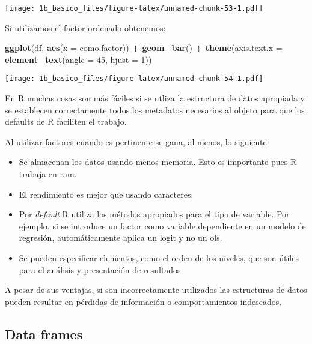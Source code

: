 \documentclass[]{article}
\newenvironment{Shaded}{\begin{snugshade}}{\end{snugshade}}
\newcommand{\KeywordTok}[1]{\textcolor[rgb]{0.13,0.29,0.53}{\textbf{#1}}}
\newcommand{\DataTypeTok}[1]{\textcolor[rgb]{0.13,0.29,0.53}{#1}}
\newcommand{\DecValTok}[1]{\textcolor[rgb]{0.00,0.00,0.81}{#1}}
\newcommand{\StringTok}[1]{\textcolor[rgb]{0.31,0.60,0.02}{#1}}
\newcommand{\OperatorTok}[1]{\textcolor[rgb]{0.81,0.36,0.00}{\textbf{#1}}}
\newcommand{\NormalTok}[1]{#1}
\begin{document}
\texttt{[image: 1b\_basico\_files/figure-latex/unnamed-chunk-53-1.pdf]}

Si utilizamos el factor ordenado obtenemos:

\begin{Shaded}
\begin{Highlighting}[]
\KeywordTok{ggplot}\NormalTok{(df, }\KeywordTok{aes}\NormalTok{(}\DataTypeTok{x =}\NormalTok{ como.factor)) }\OperatorTok{+}\StringTok{ }\KeywordTok{geom_bar}\NormalTok{() }\OperatorTok{+}\StringTok{ }
\StringTok{  }\KeywordTok{theme}\NormalTok{(}\DataTypeTok{axis.text.x =} \KeywordTok{element_text}\NormalTok{(}\DataTypeTok{angle =} \DecValTok{45}\NormalTok{, }\DataTypeTok{hjust =} \DecValTok{1}\NormalTok{))}
\end{Highlighting}
\end{Shaded}

\texttt{[image: 1b\_basico\_files/figure-latex/unnamed-chunk-54-1.pdf]}

\begin{nota}[Nota]
En R muchas cosas son más fáciles si se utliza la estructura de datos apropiada 
y se establecen correctamente todos los metadatos necesarios al objeto para 
que los defaults de R faciliten el trabajo.

Al utilizar factores cuando es pertinente se gana, al menos, lo siguiente:

\begin{itemize}
\item Se almacenan los datos usando menos memoria. Esto es importante pues R trabaja en ram.
\item El rendimiento es mejor que usando caracteres.
\item Por \textit{default} R utiliza los métodos apropiados para el tipo de variable. Por ejemplo, si se introduce un factor como variable dependiente en un modelo de regresión, automáticamente aplica un logit y no un ols.
\item Se pueden especificar elementos, como el orden de los niveles, que son útiles para el análisis y presentación de resultados.
\end{itemize}

A pesar de sus ventajas, si son incorrectamente utilizados las estructuras de datos pueden resultar en pérdidas de información o comportamientos indeseados.
\end{nota}

\subsection{Data frames}\label{data-frames}
\end{document}
